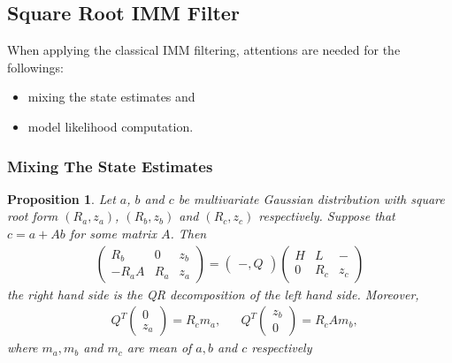 \documentclass[microtype]{gtpart}     %
\newtheorem{prop}[thm]{Proposition}   %
\theoremstyle{definition}
\begin{document}
\subsection{Square Root IMM Filter}

When applying the classical IMM filtering, attentions are needed for the followings:
\begin{itemize}
	\item mixing the state estimates and
	\item model likelihood computation.
\end{itemize}

\subsubsection{Mixing The State Estimates}

\begin{prop}
	Let $a$, $b$ and $c$ be multivariate Gaussian distribution with square root form $(R_a, z_a)$, $(R_b, z_b)$ and $(R_c, z_c)$ respectively.
	Suppose that $c = a + Ab$ for some matrix $A$. Then
	\begin{align}
		\begin{pmatrix}
			R_b &0 &z_b \\
			-R_aA &R_a &z_a
		\end{pmatrix} = \begin{pmatrix}
		-, Q
		\end{pmatrix}\begin{pmatrix}
			H &L &-\\
			0 &R_c &z_c
		\end{pmatrix}
		\label{prop_1:eq_1}
	\end{align}
	the right hand side is the QR decomposition of the left hand side.
	Moreover,
	\begin{align}
		&Q^T\begin{pmatrix}
			0 \\ z_a
		\end{pmatrix} = R_c m_a,
		&&Q^T\begin{pmatrix}
		z_b \\ 0
		\end{pmatrix} = R_c A m_b,
		\label{prop_1:eq_7}
	\end{align}
	where $m_a, m_b$ and $m_c$ are mean of $a, b$ and $c$ respectively
	\label{prop_1}
\end{prop}
\end{document}
